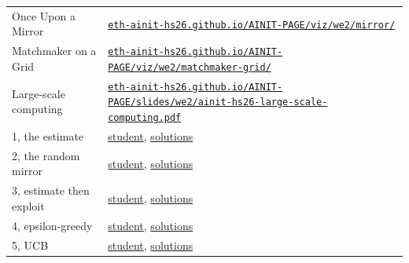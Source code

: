 \documentclass[11pt,a4paper]{article}
\begin{document}
{\small
\begin{tabular}{@{}l@{\hspace{0.5em}}l@{}}
Once Upon a Mirror & {\scriptsize\href{https://eth-ainit-hs26.github.io/AINIT-PAGE/viz/we2/mirror/}{\nolinkurl{eth-ainit-hs26.github.io/AINIT-PAGE/viz/we2/mirror/}}} \\
Matchmaker on a Grid & {\scriptsize\href{https://eth-ainit-hs26.github.io/AINIT-PAGE/viz/we2/matchmaker-grid/}{\nolinkurl{eth-ainit-hs26.github.io/AINIT-PAGE/viz/we2/matchmaker-grid/}}} \\
Large-scale computing & {\scriptsize\href{https://eth-ainit-hs26.github.io/AINIT-PAGE/slides/we2/ainit-hs26-large-scale-computing.pdf}{\nolinkurl{eth-ainit-hs26.github.io/AINIT-PAGE/slides/we2/ainit-hs26-large-scale-computing.pdf}}} \\[3pt]
1, the estimate & \href{https://colab.research.google.com/github/eth-ainit-hs26/w2-cx-public/blob/main/03_cx_bandits_1_estimates_student.ipynb}{student}, \href{https://colab.research.google.com/github/eth-ainit-hs26/w2-cx-public/blob/main/03_cx_bandits_1_estimates_solutions.ipynb}{solutions} \\
2, the random mirror & \href{https://colab.research.google.com/github/eth-ainit-hs26/w2-cx-public/blob/main/03_cx_bandits_2_random_student.ipynb}{student}, \href{https://colab.research.google.com/github/eth-ainit-hs26/w2-cx-public/blob/main/03_cx_bandits_2_random_solutions.ipynb}{solutions} \\
3, estimate then exploit & \href{https://colab.research.google.com/github/eth-ainit-hs26/w2-cx-public/blob/main/03_cx_bandits_3_estimate_then_exploit_student.ipynb}{student}, \href{https://colab.research.google.com/github/eth-ainit-hs26/w2-cx-public/blob/main/03_cx_bandits_3_estimate_then_exploit_solutions.ipynb}{solutions} \\
4, epsilon-greedy & \href{https://colab.research.google.com/github/eth-ainit-hs26/w2-cx-public/blob/main/03_cx_bandits_4_epsilon_greedy_student.ipynb}{student}, \href{https://colab.research.google.com/github/eth-ainit-hs26/w2-cx-public/blob/main/03_cx_bandits_4_epsilon_greedy_solutions.ipynb}{solutions} \\
5, UCB & \href{https://colab.research.google.com/github/eth-ainit-hs26/w2-cx-public/blob/main/03_cx_bandits_5_ucb_student.ipynb}{student}, \href{https://colab.research.google.com/github/eth-ainit-hs26/w2-cx-public/blob/main/03_cx_bandits_5_ucb_solutions.ipynb}{solutions}
\end{tabular}\par}
\end{document}
